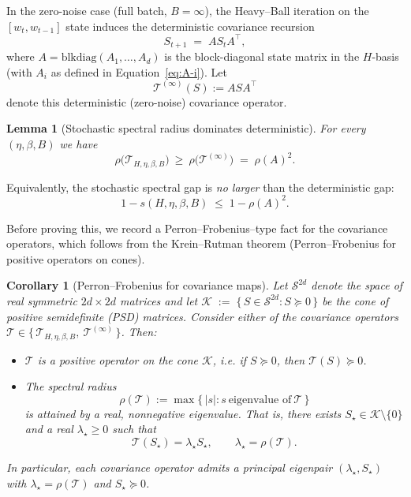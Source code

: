 \documentclass{article}
\newtheorem{lemma}{Lemma}
\newtheorem{corollary}{Corollary}
\begin{document}
In the zero-noise case (full batch, $B=\infty$), the Heavy--Ball iteration
on the $[w_t,w_{t-1}]$ state induces the deterministic covariance recursion
\[
S_{t+1} \;=\; A S_t A^\top,
\]
where $A=\mathrm{blkdiag}(A_1,\dots,A_d)$ is the block-diagonal state
matrix in the $H$-basis (with $A_i$ as defined in Equation~\ref{eq:A-i}). Let
\begin{equation}
\label{eq:TB}
\mathcal{T}^{(\infty)}(S) := A S A^\top
\end{equation}
denote this deterministic (zero-noise) covariance operator.

\begin{lemma}[Stochastic spectral radius dominates deterministic]
\label{lem:det_upper_bound}
For every $(\eta,\beta,B)$ we have
\[
\rho\big(\mathcal{T}_{H,\eta,\beta,B}\big)
\ \ge\
\rho\big(\mathcal{T}^{(\infty)}\big)
\;=\; \rho(A)^2.
\]
\end{lemma}

Equivalently, the stochastic spectral gap is \emph{no larger} than the
deterministic gap:
\[
1 - s(H,\eta,\beta,B) \;\le\; 1 - \rho(A)^2.
\]

Before proving this, we record a Perron--Frobenius–type fact for the
covariance operators, which follows from the Krein--Rutman theorem
(Perron--Frobenius for positive operators on cones).

\begin{corollary}[Perron--Frobenius for covariance maps]
\label{lem:PF}
Let $\mathcal{S}^{2d}$ denote the space of real symmetric $2d\times 2d$
matrices and let
$ \mathcal{K} \;:=\; \{\, S \in \mathcal{S}^{2d} : S \succeq 0 \,\} $
be the cone of positive semidefinite (PSD) matrices.
Consider either of the covariance operators
$\mathcal{T} \in \big\{\,\mathcal{T}_{H,\eta,\beta,B},\ \mathcal{T}^{(\infty)}\,\big\}$.
Then:
\begin{itemize}
\item $\mathcal{T}$ is a \emph{positive} operator on the cone $\mathcal{K}$, i.e.
if $
S \succeq 0$, then $\mathcal{T}(S) \succeq 0$.
\item The spectral radius
\[
\rho(\mathcal{T})
:= \max\{\,|s| : s\ \text{eigenvalue of}\ \mathcal{T}\,\}
\]
is attained by a real, nonnegative eigenvalue. That is, there exists
$S_\star \in \mathcal{K}\setminus\{0\}$ and a real $\lambda_\star \ge 0$
such that
\[
\mathcal{T}(S_\star) = \lambda_\star S_\star,
\qquad \lambda_\star = \rho(\mathcal{T}).
\]
\end{itemize}
In particular, each covariance operator admits a principal eigenpair
$(\lambda_\star,S_\star)$ with $\lambda_\star = \rho(\mathcal{T})$ and
$S_\star \succeq 0$.
\end{corollary}
\end{document}
